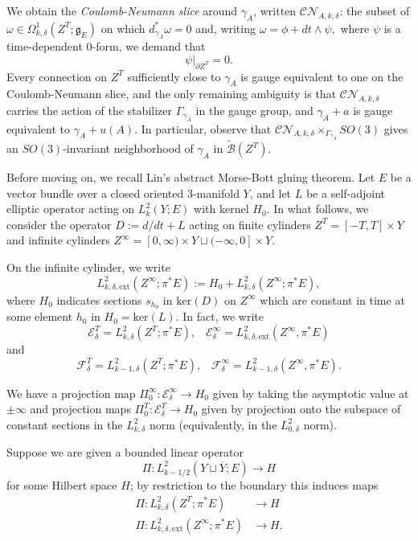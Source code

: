 \documentclass[10pt,a4paper]{amsart}
\newcommand{\pE}{\pi^* \! E}
\theoremstyle{definition}
\theoremstyle{remark}
\numberwithin{figure}{qchap}
\begin{document}
We obtain the \emph{Coulomb-Neumann slice} around $\gamma_A$, written $\mathcal{CN}_{A,k,\delta}$: the subset of $\omega \in \Omega^1_{k,\delta}(Z^T;\mathfrak g_E)$ on which $d_{\gamma_A}^* \omega = 0$ and, writing $\omega = \phi + dt \wedge \psi,$ where $\psi$ is a time-dependent $0$-form, we demand that 
$$\psi\big|_{\partial Z^T} = 0.$$
Every connection on $Z^T$ sufficiently close to $\gamma_A$ is gauge equivalent to one on the Coulomb-Neumann slice, and the only remaining ambiguity is that $\mathcal{CN}_{A,k,\delta}$ carries the action of the stabilizer $\Gamma_{\gamma_A}$ in the gauge group, and $\gamma_A + a$ is gauge equivalent to $\gamma_A + u(A)$. In particular, observe that $\mathcal{CN}_{A,k,\delta} \times_{\Gamma_{\gamma_A}} SO(3)$ gives an $SO(3)$-invariant neighborhood of $\gamma_A$ in $\widetilde{\mathcal B}(Z^T)$.

Before moving on, we recall Lin's abstract Morse-Bott gluing theorem. Let $E$ be a vector bundle over a closed oriented 3-manifold $Y$, and let $L$ be a self-adjoint elliptic operator acting on $L^2_k(Y;E)$ with kernel $H_0$. In what follows, we consider the operator $D := d/dt + L$ acting on finite cylinders $Z^T = [-T,T] \times Y$ and infinite cylinders $Z^\infty = [0,\infty) \times Y \sqcup (-\infty, 0] \times Y$.

On the infinite cylinder, we write 
$$L^2_{k,\delta,\text{ext}}(Z^\infty;\pE) := H_0 + L^2_{k,\delta}(Z^\infty;\pE),$$ 
where $H_0$ indicates sections $s_{h_0}$ in $\text{ker}(D)$ on $Z^\infty$ which are constant in time at some element $h_0$ in $H_0 = \text{ker}(L)$. In fact, we write 
$$\mathcal E^T_\delta = L^2_{k,\delta}(Z^T;\pE), \;\;\; \mathcal E^\infty_\delta = L^2_{k,\delta,\text{ext}}(Z^\infty, \pE)$$ 
and 
$$\mathcal F^T_\delta = L^2_{k-1,\delta}(Z^T;\pE), \;\;\; \mathcal F^\infty_\delta = L^2_{k-1,\delta}(Z^\infty, \pE).$$ 

We have a projection map $\Pi^\infty_0: \mathcal E^\infty_\delta \to H_0$ given by taking the asymptotic value at $\pm \infty$ and projection maps $\Pi^T_0: \mathcal E^T_\delta \to H_0$ given by projection onto the subspace of constant sections in the $L^2_{k,\delta}$ norm (equivalently, in the $L^2_{0,\delta}$ norm).

Suppose we are given a bounded linear operator 
$$\Pi: L^2_{k-1/2}(Y \sqcup \overline Y; E) \to H$$ 
for some Hilbert space $H$; by restriction to the boundary this induces maps 
\begin{align*}\Pi: L^2_{k,\delta}(Z^T;\pE) &\to H\\
\Pi: L^2_{k,\delta,\text{ext}}(Z^\infty;\pE) &\to H.
\end{align*}
\end{document}
